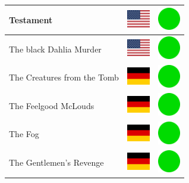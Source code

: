 \documentclass[12pt, a4paper, twoside]{report}
\begin{document}
\begin{center}
\begin{longtable}{|p{5cm}|p{2cm}|p{2cm}|}
Testament & \includegraphics[width=1cm]{4x3/us} & \includegraphics[width=1cm]{likes/y} \\ \hline
The black Dahlia Murder & \includegraphics[width=1cm]{4x3/us} & \includegraphics[width=1cm]{likes/y} \\ \hline
The Creatures from the Tomb & \includegraphics[width=1cm]{4x3/de} & \includegraphics[width=1cm]{likes/y} \\ \hline
The Feelgood McLouds & \includegraphics[width=1cm]{4x3/de} & \includegraphics[width=1cm]{likes/y} \\ \hline
The Fog & \includegraphics[width=1cm]{4x3/de} & \includegraphics[width=1cm]{likes/y} \\ \hline
The Gentlemen's Revenge & \includegraphics[width=1cm]{4x3/de} & \includegraphics[width=1cm]{likes/y} \\ \hline

\end{longtable}
\end{center}
\end{document}
